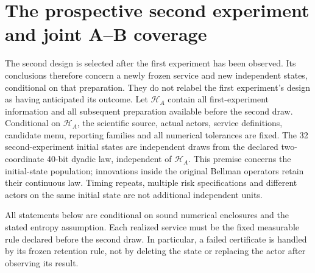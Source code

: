 \section{The prospective second experiment and joint A--B coverage}
\label{supp:inference124b}

The second design is selected after the first experiment has been
observed. Its conclusions therefore concern a newly frozen service and
new independent states, conditional on that preparation. They do not
relabel the first experiment's design as having anticipated its outcome.
Let $\mathcal H_A$ contain all first-experiment information and all
subsequent preparation available before the second draw. Conditional on
$\mathcal H_A$, the scientific source, actual actors, service definitions,
candidate menu, reporting families and all numerical tolerances are fixed.
The 32 second-experiment initial states are independent draws from the
declared two-coordinate 40-bit dyadic law, independent of
$\mathcal H_A$. This premise concerns the initial-state population;
innovations inside the original Bellman operators retain their continuous
law. Timing repeats, multiple risk specifications and different actors on
the same initial state are not additional independent units.

All statements below are conditional on sound numerical enclosures and
the stated entropy assumption. Each realized service must be the fixed
measurable rule declared before the second draw. In particular, a failed
certificate is handled by its frozen retention rule, not by deleting the
state or replacing the actor after observing its result.

